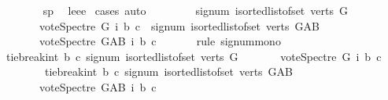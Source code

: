 \begin{isabellebody}
\ \ \ \ \ \ \isamarkupfalse%
\ sp{}\ \isamarkupfalse%
\ leee\ \isamarkupfalse%
{\isacharparenleft}{\kern0pt}cases{\isacharcomma}{\kern0pt}\ auto{\isacharparenright}{\kern0pt}\ \isamarkupfalse%
\isanewline
\ \ \ \ \isamarkupfalse%
\ \isamarkupfalse%
\ {\isachardoublequoteopen}signum\ {\isacharparenleft}{\kern0pt}{\isasymSum}i{\isasymleftarrow}sorted{\isacharunderscore}{\kern0pt}list{\isacharunderscore}{\kern0pt}of{\isacharunderscore}{\kern0pt}set\ {\isacharparenleft}{\kern0pt}verts\ G{\isacharparenright}{\kern0pt}{\isachardot}{\kern0pt}\isanewline
\ \ \ \ \ \ \ vote{\isacharunderscore}{\kern0pt}Spectre\ G\ i\ b\ c{\isacharparenright}{\kern0pt}\ {\isasymle}\ signum\ {\isacharparenleft}{\kern0pt}{\isasymSum}i{\isasymleftarrow}sorted{\isacharunderscore}{\kern0pt}list{\isacharunderscore}{\kern0pt}of{\isacharunderscore}{\kern0pt}set\ {\isacharparenleft}{\kern0pt}verts\ G{\isacharunderscore}{\kern0pt}AB{\isacharparenright}{\kern0pt}{\isachardot}{\kern0pt}\isanewline
\ \ \ \ \ \ \ vote{\isacharunderscore}{\kern0pt}Spectre\ G{\isacharunderscore}{\kern0pt}AB\ i\ b\ c{\isacharparenright}{\kern0pt}{\isachardoublequoteclose}\isanewline
\ \ \ \ \ \ \isamarkupfalse%
{\isacharparenleft}{\kern0pt}rule\ signum{\isacharunderscore}{\kern0pt}mono{\isacharparenright}{\kern0pt}\isanewline
\ \ \ \ \isamarkupfalse%
\ \isamarkupfalse%
\ {\isachardoublequoteopen}tie{\isacharunderscore}{\kern0pt}break{\isacharunderscore}{\kern0pt}int\ b\ c\ {\isacharparenleft}{\kern0pt}signum\ {\isacharparenleft}{\kern0pt}{\isasymSum}i{\isasymleftarrow}sorted{\isacharunderscore}{\kern0pt}list{\isacharunderscore}{\kern0pt}of{\isacharunderscore}{\kern0pt}set\ {\isacharparenleft}{\kern0pt}verts\ G{\isacharparenright}{\kern0pt}{\isachardot}{\kern0pt}\isanewline
\ \ \ \ \ \ \ vote{\isacharunderscore}{\kern0pt}Spectre\ G\ i\ b\ c{\isacharparenright}{\kern0pt}{\isacharparenright}{\kern0pt}\ \isanewline
\ \ \ \ \ \ \ {\isasymle}\ tie{\isacharunderscore}{\kern0pt}break{\isacharunderscore}{\kern0pt}int\ b\ c\ {\isacharparenleft}{\kern0pt}signum\ {\isacharparenleft}{\kern0pt}{\isasymSum}i{\isasymleftarrow}sorted{\isacharunderscore}{\kern0pt}list{\isacharunderscore}{\kern0pt}of{\isacharunderscore}{\kern0pt}set\ {\isacharparenleft}{\kern0pt}verts\ G{\isacharunderscore}{\kern0pt}AB{\isacharparenright}{\kern0pt}{\isachardot}{\kern0pt}\isanewline
\ \ \ \ \ \ \ vote{\isacharunderscore}{\kern0pt}Spectre\ G{\isacharunderscore}{\kern0pt}AB\ i\ b\ c{\isacharparenright}{\kern0pt}{\isacharparenright}{\kern0pt}{\isachardoublequoteclose}\isanewline

\end{isabellebody}

